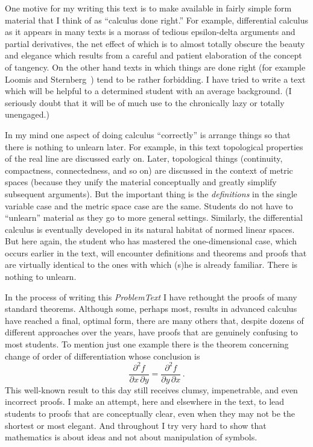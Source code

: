 One motive for my writing this text is to make available in fairly simple form material
that I think of as ``calculus done right.''  For example, differential calculus as it
appears in many texts is a morass of tedious epsilon-delta arguments and partial
derivatives, the net effect of which is to almost totally obscure the beauty and elegance
which results from a careful and patient elaboration of the concept of tangency. On the
other hand texts in which things are done right (for example Loomis and
Sternberg~\cite{LoomisS:1990}) tend to be rather forbidding.  I have tried to write a
text which will be helpful to a determined student with an average background.  (I
seriously doubt that it will be of much use to the chronically lazy or totally
unengaged.)

In my mind one aspect of doing calculus ``correctly'' is arrange things so that there is
nothing to unlearn later.  For example, in this text topological properties of the real
line are discussed early on.  Later, topological things (continuity, compactness,
connectedness, and so on) are discussed in the context of metric spaces (because they
unify the material conceptually and greatly simplify subsequent arguments).  But the
important thing is the \emph{definitions} in the single variable case and the metric
space case are the same. Students do not have to ``unlearn'' material as they go to more
general settings.  Similarly, the differential calculus is eventually developed in its
natural habitat of normed linear spaces.  But here again, the student who has mastered
the one-dimensional case, which occurs earlier in the text, will encounter definitions
and theorems and proofs that are virtually identical to the ones with which (s)he is
already familiar.  There is nothing to unlearn.

In the process of writing this \emph{ProblemText} I have rethought the proofs of many
standard theorems. Although some, perhaps most, results in advanced calculus have reached
a final, optimal form, there are many others that, despite dozens of different approaches
over the years, have proofs that are genuinely confusing to most students.  To mention
just one example there is the theorem concerning change of order of differentiation whose
conclusion is
  \[ \frac{\partial^2f}{\partial x \, \partial y} =
               \frac{\partial^2f}{\partial y \, \partial x}\,. \]
This well-known result to this day still receives clumsy, impenetrable, and even
incorrect proofs. I make an attempt, here and elsewhere in the text, to lead students to
proofs that are conceptually clear, even when they may not be the shortest or most
elegant.  And throughout I try very hard to show that mathematics is about ideas and not
about manipulation of symbols.

